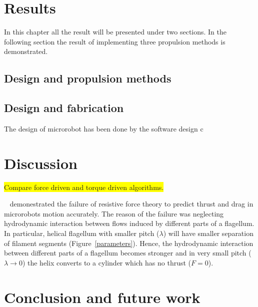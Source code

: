 \documentclass[12pt,a4paper,titlepage]{report}
\newcommand{\hilight}[1]{\colorbox{yellow}{#1}}
\begin{document}
\chapter{Results}\label{result}
In this chapter all the result will be presented under two sections. In the following section the result of implementing
three propulsion methods is demonstrated.


\section{Design and propulsion methods}

\section{Design and fabrication}

The design of microrobot has been done by the software design c


























\chapter{Discussion}\label{discussion}

 \hilight{Compare force driven and torque driven algorithms.}


\citeauthor{rodenborn2013propulsion}~\citep{rodenborn2013propulsion} demonestrated the failure of resistive force
 theory to predict thrust and drag in microrobots motion accurately. The reason of the failure was neglecting hydrodynamic
interaction between flows induced by different parts of a flagellum. In particular, helical flagellum with
 smaller pitch ($\lambda$) will have smaller separation of filament segments (Figure~\ref{parameters}). Hence,
 the hydrodynamic interaction between different parts of a flagellum becomes stronger and in very small
pitch ($\lambda \to 0$) the helix converts to a cylinder which has no thrust ($F= 0$).

\chapter{Conclusion and future work}



\nocite{lauga2006swimming}



\renewcommand{\bibname}{References}

 
\end{document}
